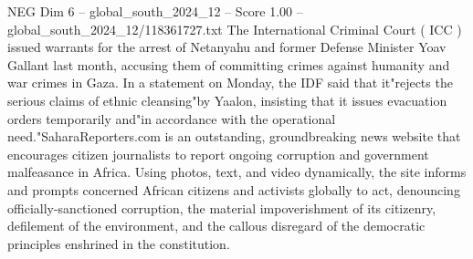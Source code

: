 \begin{textsample}{NEG Dim 6 – global\_south\_2024\_12 – Score 1.00 – global\_south\_2024\_12/118361727.txt}
The International Criminal Court ( ICC ) issued warrants for the arrest of Netanyahu and former Defense Minister Yoav Gallant last month, accusing them of committing crimes against humanity and war crimes in Gaza.
In a statement on Monday, the IDF said that it"rejects the serious claims of ethnic cleansing"by Yaalon, insisting that it issues evacuation orders temporarily and"in accordance with the operational need."SaharaReporters.com is an outstanding, groundbreaking news website that encourages citizen journalists to report ongoing corruption and government malfeasance in Africa.
Using photos, text, and video dynamically, the site informs and prompts concerned African citizens and activists globally to act, denouncing officially-sanctioned corruption, the material impoverishment of its citizenry, defilement of the environment, and the callous disregard of the democratic principles enshrined in the constitution.

\end{textsample}
